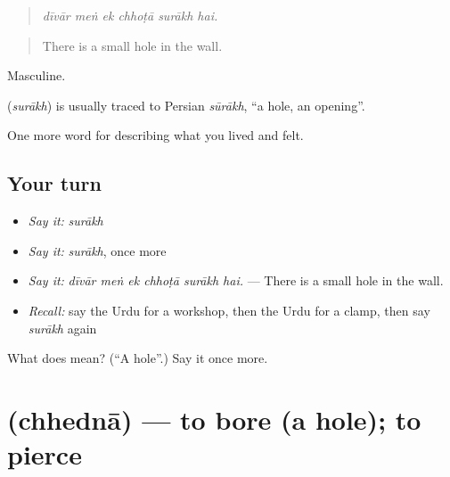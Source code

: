 \begin{quote}
     
\end{quote}

\begin{quote}
\emph{dīvār meṅ ek chhoṭā surākh hai.}
\end{quote}

\begin{quote}
There is a small hole in the wall.
\end{quote}

Masculine.

\begin{cousinweb}
\textbf{} (\emph{surākh}) is usually traced to Persian \emph{sūrākh}, \textquotedblleft{}a hole, an opening\textquotedblright{}.
\end{cousinweb}

\begin{grammarlens}[title={What you've built}]
One more word for describing what you lived and felt.
\end{grammarlens}

\subsection*{Your turn}
\begin{itemize}
\raggedright
  \item \emph{Say it:} \emph{surākh}
  \item \emph{Say it:} \emph{surākh}, once more
  \item \emph{Say it:} \emph{dīvār meṅ ek chhoṭā surākh hai.} — There is a small hole in the wall.
  \item \emph{Recall:} say the Urdu for a workshop, then the Urdu for a clamp, then say \emph{surākh} again
\end{itemize}

\begin{tcolorbox}[breakable,colback=teal!4,colframe=teal!35!black,title={Before you move on}]
What does  mean? (\textquotedblleft{}A hole\textquotedblright{}.) Say it once more.
\end{tcolorbox}
\section[\texorpdfstring{\ur{چھیدنا} (chhednā)}{چھیدنا (chhednā)}]{ (chhednā) — to bore (a hole); to pierce}

\label{lesson:UR-C496-chhedna}



